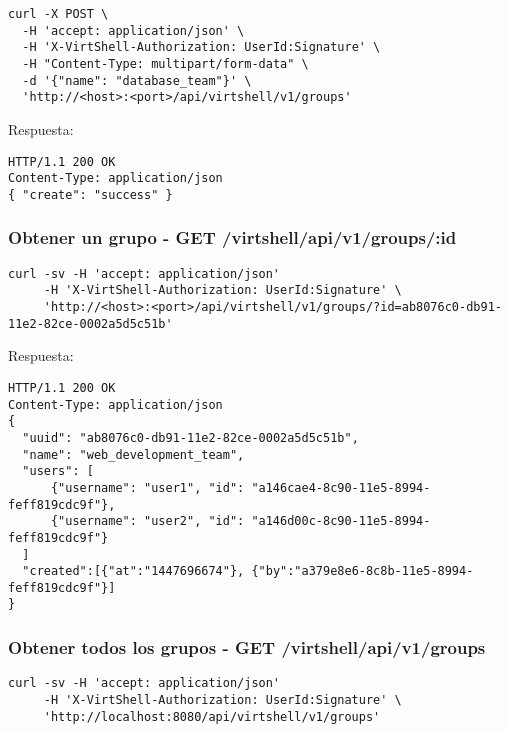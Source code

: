\begin{lstlisting}[style=json]
curl -X POST \
  -H 'accept: application/json' \
  -H 'X-VirtShell-Authorization: UserId:Signature' \
  -H "Content-Type: multipart/form-data" \
  -d '{"name": "database_team"}' \
  'http://<host>:<port>/api/virtshell/v1/groups'
\end{lstlisting}

\vspace{1cm}
Respuesta:
\vspace{1cm}

\begin{lstlisting}[style=json]
HTTP/1.1 200 OK
Content-Type: application/json
{ "create": "success" }
\end{lstlisting}

\subsubsection{Obtener un grupo - GET /virtshell/api/v1/groups/:id}

\begin{lstlisting}[style=json]
curl -sv -H 'accept: application/json' 
     -H 'X-VirtShell-Authorization: UserId:Signature' \ 
     'http://<host>:<port>/api/virtshell/v1/groups/?id=ab8076c0-db91-11e2-82ce-0002a5d5c51b'
\end{lstlisting}

\vspace{1cm}
Respuesta:
\vspace{1cm}

\begin{lstlisting}[style=json]
HTTP/1.1 200 OK
Content-Type: application/json
{
  "uuid": "ab8076c0-db91-11e2-82ce-0002a5d5c51b",
  "name": "web_development_team",
  "users": [ 
      {"username": "user1", "id": "a146cae4-8c90-11e5-8994-feff819cdc9f"},
      {"username": "user2", "id": "a146d00c-8c90-11e5-8994-feff819cdc9f"}
  ]
  "created":[{"at":"1447696674"}, {"by":"a379e8e6-8c8b-11e5-8994-feff819cdc9f"}]
}
\end{lstlisting}

\subsubsection{Obtener todos los grupos - GET /virtshell/api/v1/groups}

\begin{lstlisting}[style=json]
curl -sv -H 'accept: application/json' 
     -H 'X-VirtShell-Authorization: UserId:Signature' \ 
     'http://localhost:8080/api/virtshell/v1/groups'
\end{lstlisting}

